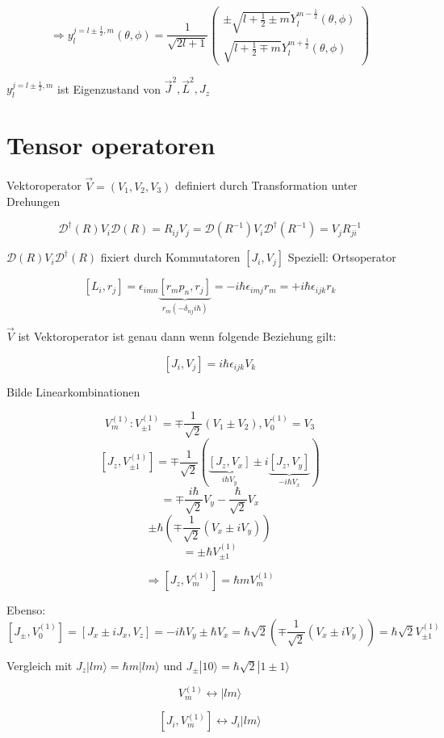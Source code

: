 \[ \Rightarrow 
y^{j= l\pm\frac 1 2,m}_l(\theta,\phi) =\frac 1 {\sqrt{2l+1}} 
\begin{pmatrix} 
\pm\sqrt{l+\frac 1 2 \pm m} Y^{m-\frac 1  2}_l(\theta,\phi) \\ 
\sqrt{l+\frac 1 2 \mp m} Y^{m+\frac 1  2}_l(\theta,\phi)
\end{pmatrix}
\]


\( y^{j= l\pm\frac 1 2,m}_l \) ist Eigenzustand von \(\vec J^2, \vec L^2, J_z\)

\section{Tensor operatoren}

Vektoroperator \(\vec V = (V_1,V_2,V_3)\) definiert durch Transformation
unter Drehungen

\[ \mathcal D^\dagger (R) V_i \mathcal D(R)= R_{ij}V_j =  \mathcal
D(R^{-1})V_i \mathcal D^\dagger (R^{-1}) = V_jR^{-1}_{ji}\]

\(\mathcal D (R) V_i \mathcal D^\dagger(R)\) fixiert durch Kommutatoren
\([J_i,V_j]\) Speziell: Ortsoperator

\[ [L_i,r_j]=
\epsilon_{imn}\underbrace{[r_mp_n,r_j]}_{r_m(-\delta_{nj}i\hbar)} =
-i\hbar \epsilon_{imj}r_m = +i\hbar \epsilon_{ijk}r_k \]

\(\vec V\) ist Vektoroperator ist genau dann wenn folgende Beziehung
gilt:

\[ [J_i,V_j] = i\hbar\epsilon_{ijk}V_k \]

Bilde Linearkombinationen 

\[ V^{(1)}_m: V^{(1)}_{\pm 1} = \mp \frac 1 {\sqrt 2}(V_1\pm V_2),
V^{(1)}_0=V_3 \]
\[[J_z,V^{(1)}_{\pm 1}] = \mp \frac 1 {\sqrt
  2}(\underbrace{[J_z,V_x]}_{i\hbar V_y}\pm
i\underbrace{[J_z,V_y]}_{-i\hbar V_x})\]
\[ = \mp \frac{i\hbar}{\sqrt 2} V_y - \frac{\hbar}{\sqrt 2} V_x \]
\[ \pm \hbar ( \mp  \frac 1 {\sqrt  2} (V_x \pm iV_y))\]
\[ =\pm \hbar V^{(1)}_{\pm 1} \]

\[ \Rightarrow [J_z, V^{(1)}_m] = \hbar m V^{(1)}_m \]


Ebenso:
\[ [J_\pm, V^{(1)}_0] = [J_x\pm iJ_x,V_z] = -i \hbar
V_y\pm \hbar V_x = \hbar \sqrt 2 (\mp \frac 1 {\sqrt 2}(V_x\pm iV_y))
= \hbar \sqrt 2 V^{(1)}_{\pm 1} \]

Vergleich mit \(J_z|lm\rangle = \hbar m|lm\rangle\) und  \(J_\pm|10\rangle =
\hbar \sqrt 2|1\pm 1\rangle\)

\[ V^{(1)}_m \leftrightarrow | l m\rangle \]

\[[J_i, V^{(1)}_m]  \leftrightarrow J_i|lm\rangle \]

